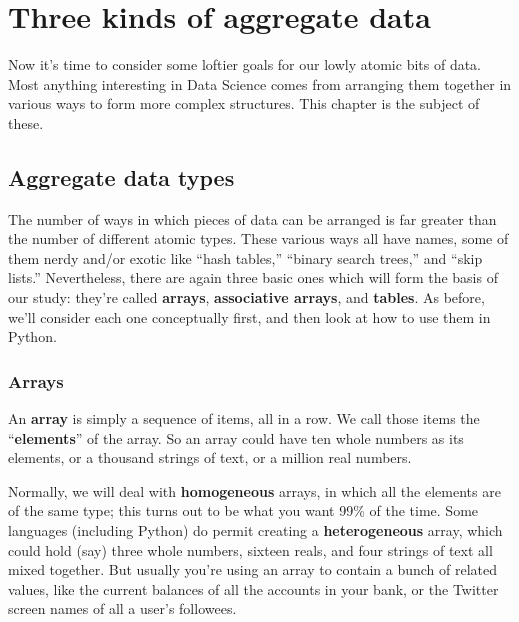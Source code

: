 
%

\chapter{Three kinds of aggregate data}
\label{ch:aggregateData}

Now it's time to consider some loftier goals for our lowly atomic bits of data.
Most anything interesting in Data Science comes from arranging them together in
various ways to form more complex structures. This chapter is the subject of
these.

\section{Aggregate data types}

The number of ways in which pieces of data can be arranged is far greater than
the number of different atomic types. These various ways all have names, some
of them nerdy and/or exotic like ``hash tables,'' ``binary search trees,'' and
``skip lists.'' Nevertheless, there are again three basic ones which will form
the basis of our study: they're called \textbf{arrays}, \textbf{associative
arrays}, and \textbf{tables}. As before, we'll consider each one conceptually
first, and then look at how to use them in Python.

\subsection{Arrays}

An \textbf{array} is simply a sequence of items, all in a row. We call those
items the ``\textbf{elements}'' of the array. So an array could have ten whole
numbers as its elements, or a thousand strings of text, or a million real
numbers.

Normally, we will deal with \textbf{homogeneous} arrays, in which all the
elements are of the same type; this turns out to be what you want 99\% of the
time. Some languages (including Python) do permit creating a
\textbf{heterogeneous} array, which could hold (say) three whole numbers,
sixteen reals, and four strings of text all mixed together. But usually you're
using an array to contain a bunch of related values, like the current balances
of all the accounts in your bank, or the Twitter screen names of all a user's
followees.

